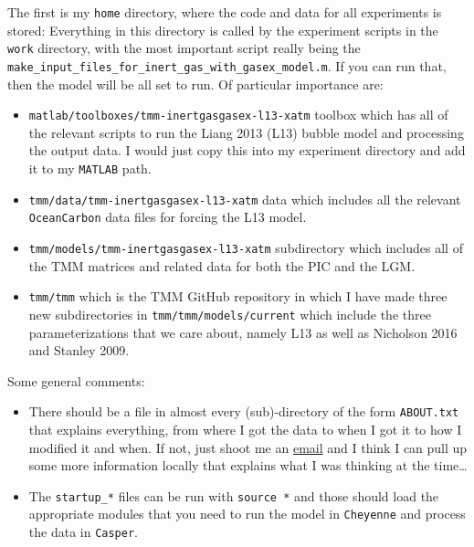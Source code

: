 \documentclass[12pt]{article}
\begin{document}
The first is my \verb|home| directory, where the code and data for all experiments is stored:
\medskip
{}
Everything in this directory is called by the experiment scripts in the \verb|work| directory, with the most important script really being the \verb|make_input_files_for_inert_gas_with_gasex_model.m|. If you can run that, then the model will be all set to run.
Of particular importance are: 
\begin{itemize}
	\item \verb|matlab/toolboxes/tmm-inertgasgasex-l13-xatm| toolbox which has all of the relevant scripts to run the Liang 2013 (L13) bubble model and processing the output data. I would just copy this into my experiment directory and add it to my \verb|MATLAB| path.
	\item \verb|tmm/data/tmm-inertgasgasex-l13-xatm| data which includes all the relevant \verb|OceanCarbon| data files for forcing the L13 model.
	\item \verb|tmm/models/tmm-inertgasgasex-l13-xatm| subdirectory which includes all of the TMM matrices and related data for both the PIC and the LGM. 
	\item \verb|tmm/tmm| which is the TMM GitHub repository in which I have made three new subdirectories in \verb|tmm/tmm/models/current| which include the three parameterizations that we care about, namely L13 as well as Nicholson 2016 and Stanley 2009.
\end{itemize}
Some general comments:
\begin{itemize}
	\item There should be a file in almost every (sub)-directory of the form \verb|ABOUT.txt| that explains everything, from where I got the data to when I got it to how I modified it and when. If not, just shoot me an \href{mailto:perrinwd@mit.edu}{email} and I think I can pull up some more information locally that explains what I was thinking at the time\ldots
	\item The \verb|startup_*| files can be run with \verb|source *| and those should load the appropriate modules that you need to run the model in \verb|Cheyenne| and process the data in \verb|Casper|.
\end{itemize}
\end{document}
